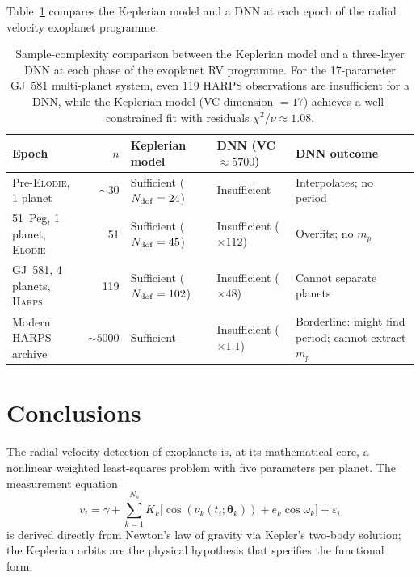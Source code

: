 \documentclass[12pt]{article}
\begin{document}
Table~\ref{tab:sample_complexity} compares the Keplerian model and a DNN
at each epoch of the radial velocity exoplanet programme.

\begin{table}[ht]
\centering
\caption{Sample-complexity comparison between the Keplerian model and a
three-layer DNN at each phase of the exoplanet RV programme.  For the
17-parameter GJ~581 multi-planet system, even 119 HARPS observations are
insufficient for a DNN, while the Keplerian model (VC dimension $= 17$)
achieves a well-constrained fit with residuals $\chi^2/\nu \approx 1.08$.}
\label{tab:sample_complexity}
\begin{tabular}{p{2.8cm}rp{2.6cm}p{2.6cm}p{3.0cm}}
\toprule
Epoch & $n$ & Keplerian model & DNN (VC$\approx5700$) & DNN outcome \\
\midrule
Pre-\textsc{Elodie}, 1 planet & $\sim 30$ &
  Sufficient ($N_{\rm dof} = 24$) & Insufficient & Interpolates; no period \\
51~Peg, 1 planet, \textsc{Elodie} & 51 &
  Sufficient ($N_{\rm dof} = 45$) & Insufficient ($\times 112$) &
  Overfits; no $m_p$ \\
GJ~581, 4 planets, \textsc{Harps} & 119 &
  Sufficient ($N_{\rm dof} = 102$) & Insufficient ($\times 48$) &
  Cannot separate planets \\
Modern HARPS archive & $\sim 5000$ &
  Sufficient& Insufficient ($\times 1.1$) &
  Borderline: might find period; cannot extract $m_p$ \\
\bottomrule
\end{tabular}
\end{table}

\section{Conclusions}
\label{sec:conclusions}

The radial velocity detection of exoplanets is, at its mathematical core,
a nonlinear weighted least-squares problem with five parameters per planet.
The measurement equation
\[
  v_i = \gamma + \sum_{k=1}^{N_p}
    K_k\bigl[\cos(\nu_k(t_i;\boldsymbol\theta_k)) + e_k\cos\omega_k\bigr]
  + \varepsilon_i
\]
is derived directly from Newton's law of gravity via Kepler's two-body
solution; the Keplerian orbits are the physical hypothesis that specifies
the functional form.
\end{document}
